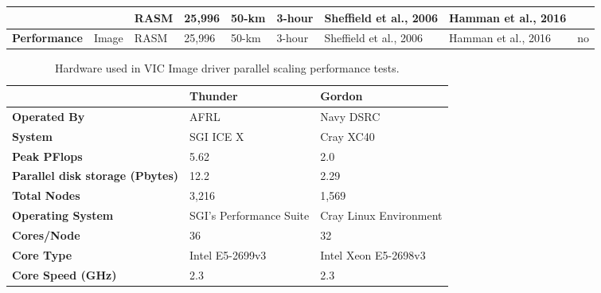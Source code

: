 \documentclass[gmd, manuscript]{copernicus}
\begin{document}
\begin{table}[]
{\begin{tabular}{|l|l|l|l|l|l|l|l|l|}
                                  &                              & RASM            & 25,996              & 50-km               & 3-hour            & Sheffield et al., 2006 & Hamman et al., 2016 &                     \\ \hline
\textbf{Performance}              & Image                        & RASM            & 25,996              & 50-km               & 3-hour            & Sheffield et al., 2006 & Hamman et al., 2016 & no                  \\ \hline
\end{tabular}
}
\end{table}

\clearpage
\begin{table}[]
\centering
\caption{Hardware used in VIC Image driver parallel scaling performance tests.}
\label{table:hardware}
\begin{tabular}{|l|l|l|}
\hline
\textbf{}                                & \textbf{Thunder}                            & \textbf{Gordon}                             \\ \hline
\textbf{Operated By}                     & AFRL                                        & Navy DSRC                                   \\ \hline
\textbf{System}                          & SGI ICE X                                   & Cray XC40                                   \\ \hline
\textbf{Peak PFlops}                     & 5.62                                        & 2.0                                         \\ \hline
\textbf{Parallel disk storage (Pbytes)}  & 12.2                                        & 2.29                                        \\ \hline
\textbf{Total Nodes}                     & 3,216                                       & 1,569                                       \\ \hline
\textbf{Operating System}                & SGI's Performance Suite                     & Cray Linux Environment                      \\ \hline
\textbf{Cores/Node}                      & 36                                          & 32                                          \\ \hline
\textbf{Core Type}                       & Intel E5-2699v3                             & Intel Xeon E5-2698v3                        \\ \hline
\textbf{Core Speed (GHz)}                & 2.3                                         & 2.3                                         \\ \hline

\end{tabular}
\end{table}
\end{document}
